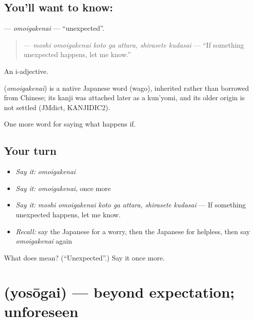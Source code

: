 \subsection*{You'll want to know: }
\textbf{} — \emph{omoigakenai} — \textquotedblleft{}unexpected\textquotedblright{}.

\begin{quote}
\textbf{    } — \emph{moshi omoigakenai koto ga attara, shirasete kudasai} — \textquotedblleft{}If something unexpected happens, let me know.\textquotedblright{}
\end{quote}

An i-adjective.

\begin{cousinweb}
\textbf{} (\emph{omoigakenai}) is a native Japanese word (wago), inherited rather than borrowed from Chinese; its kanji was attached later as a kun'yomi, and its older origin is not settled (JMdict, KANJIDIC2).
\end{cousinweb}

\begin{grammarlens}[title={What you've built}]
One more word for saying what happens if.
\end{grammarlens}

\subsection*{Your turn}
\begin{itemize}
\raggedright
  \item \emph{Say it:} \emph{omoigakenai}
  \item \emph{Say it:} \emph{omoigakenai}, once more
  \item \emph{Say it:} \emph{moshi omoigakenai koto ga attara, shirasete kudasai} — If something unexpected happens, let me know.
  \item \emph{Recall:} say the Japanese for a worry, then the Japanese for helpless, then say \emph{omoigakenai} again
\end{itemize}

\begin{tcolorbox}[breakable,colback=teal!4,colframe=teal!35!black,title={Before you move on}]
What does  mean? (\textquotedblleft{}Unexpected\textquotedblright{}.) Say it once more.
\end{tcolorbox}
\section[\texorpdfstring{\ja{よそうがい} (yosōgai)}{よそうがい (yosōgai)}]{ (yosōgai) — beyond expectation; unforeseen}


